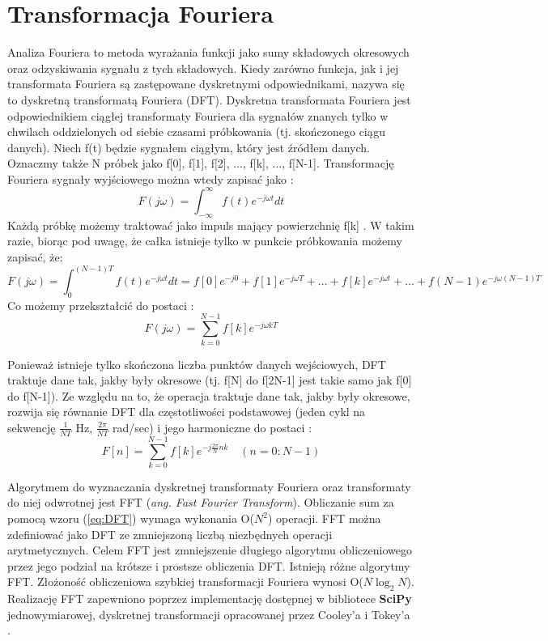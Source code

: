 \documentclass[a4paper,11pt,twoside,openright]{article} %
\begin{document}
\section{Transformacja Fouriera} \label{chapter:fourier}
\noindent Analiza Fouriera to metoda wyrażania funkcji jako sumy składowych okresowych oraz odzyskiwania sygnału z tych składowych. Kiedy zarówno funkcja, jak i jej transformata Fouriera są zastępowane dyskretnymi odpowiednikami, nazywa się to dyskretną transformatą Fouriera (DFT). Dyskretna transformata Fouriera jest odpowiednikiem ciągłej transformaty Fouriera dla sygnałów znanych tylko w chwilach oddzielonych od siebie czasami próbkowania (tj.
skończonego ciągu danych). Niech f(t) będzie sygnałem ciągłym, który jest źródłem danych. Oznaczmy także N próbek jako  f[0], f[1], f[2], ..., f[k], ..., f[N-1]. Transformację Fouriera sygnały wyjściowego można wtedy zapisać jako \cite{HJNus}:
\begin{equation}
F(j \omega) = \int_{-\infty}^{\infty} f(t) e^{-j \omega t }dt
\end{equation}
\noindent Każdą próbkę możemy traktować jako impuls mający powierzchnię f[k] \cite{HJNus}. W takim razie, biorąc pod uwagę, że całka istnieje tylko w punkcie próbkowania możemy zapisać, że:
\begin{equation}
F(j \omega) = \int_{0}^{(N-1)T} f(t) e^{-j \omega t }dt = f[0]e^{-j 0} + f[1]e^{-j \omega T} + ... + f[k]e^{-j \omega t} + ... +  f(N-1) e^{-j \omega (N-1) T }
\end{equation}
\noindent Co możemy przekształcić do postaci \cite{Rao}:
\begin{equation}
F(j\omega) = \sum_{k=0}^{N-1} f[k] e^{-j \omega k T}
\end{equation}

\noindent Ponieważ istnieje tylko skończona liczba punktów danych wejściowych, DFT traktuje dane tak, jakby były okresowe (tj. f[N] do f[2N-1] jest takie samo jak f[0] do f[N-1]). Ze względu na to, że operacja traktuje dane tak, jakby były okresowe, rozwija się równanie DFT dla częstotliwości podstawowej (jeden cykl na sekwencję $\frac{1}{NT}$ Hz, $\frac{2 \pi}{NT}$ rad/sec) i jego harmoniczne do postaci \cite{Rao}:
\begin{equation} \label{eq:DFT}
F[n] = \sum^{N-1}_{k=0}f[k]e^{-j \frac{2 \pi}{N}nk}   \quad (n=0 : N-1)
\end{equation}

\noindent  Algorytmem do wyznaczania dyskretnej transformaty Fouriera oraz transformaty do niej odwrotnej jest FFT (\textit{ang. Fast Fourier Transform}). Obliczanie sum za pomocą wzoru (\ref{eq:DFT}) wymaga wykonania O($N^2$) operacji. FFT można zdefiniować jako DFT ze zmniejszoną liczbą niezbędnych operacji arytmetycznych. Celem FFT jest zmniejszenie długiego algorytmu obliczeniowego przez jego podział na krótsze i prostsze obliczenia DFT. Istnieją różne algorytmy FFT. Złożoność obliczeniowa szybkiej transformacji Fouriera wynosi O($N\log_2 N$). Realizację FFT zapewniono poprzez implementację dostępnej w bibliotece \textbf{SciPy} jednowymiarowej, dyskretnej transformacji opracowanej przez Cooley'a i Tokey'a \cite{FFT_cooley}.
\end{document}
